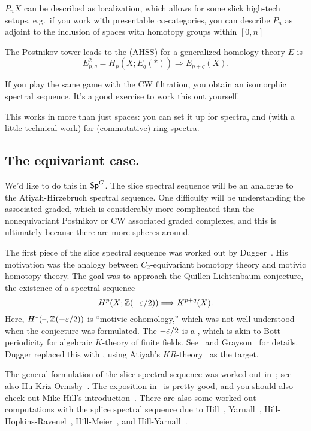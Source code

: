 $P_nX$ can be described as localization, which allows for some slick high-tech setups, e.g.\ if you work with
presentable $\infty$-categories, you can describe $P_n$ as adjoint to the inclusion of spaces with homotopy groups
within $[0,n]$

The Postnikov tower leads to the  (AHSS) for a generalized homology
theory $E$ is
\[E_{p,q}^2 = H_p(X; E_q(*))\Longrightarrow E_{p+q}(X).\]
\begin{ex}
If you play the same game with the CW filtration, you obtain an isomorphic spectral sequence. It's a good exercise
to work this out yourself.
\end{ex}
This works in more than just spaces: you can set it up for spectra, and (with a little technical work) for
(commutative) ring spectra.
\subsection*{The equivariant case.}
We'd like to do this in $\mathsf{Sp}^G$. The slice spectral sequence will be an analogue to the Atiyah-Hirzebruch spectral
sequence. One difficulty will be understanding the associated graded, which is considerably more complicated than
the nonequivariant Postnikov or CW associated graded complexes, and this is ultimately because there are more
spheres around.

The first piece of the slice spectral sequence was worked out by Dugger~\cite{DuggerKR}. His motivation was the
analogy between $C_2$-equivariant homotopy theory and motivic homotopy theory.   The goal was to approach the Quillen-Lichtenbaum conjecture, the existence of a spectral sequence
\[H^p(X; \mathbb Z(-\varepsilon/2))\Longrightarrow K^{p+q}(X).\]
Here, $H^*(\text{--},\mathbb Z(-\varepsilon/2))$ is ``motivic cohomology,'' which was not well-understood when the conjecture was
formulated. The $-\varepsilon/2$ is a , which is akin to Bott periodicity for algebraic $K$-theory of
finite fields. See~ and Grayson~\cite{Grayson} for details. Dugger replaced this with
\TODO, using Atiyah's $\mathit{KR}$-theory~\cite{AtiyahKR} as the target.

The general formulation of the slice spectral sequence was worked out in~\cite{HHR}; see also
Hu-Kriz-Ormsby~\cite{HKO11}. The exposition in~\cite{HHR} is pretty good, and you should also check out Mike Hill's
introduction~\cite{HillSlice}.  There are also some worked-out computations with the splice spectral sequence due
to Hill~\cite{HillRealBordism}, Yarnall~\cite{Yarnall}, Hill-Hopkins-Ravenel~\cite{HHR_HZ, HHR_C4},
Hill-Meier~\cite{HillMeier}, and Hill-Yarnall~\cite{HillYarnall}.


